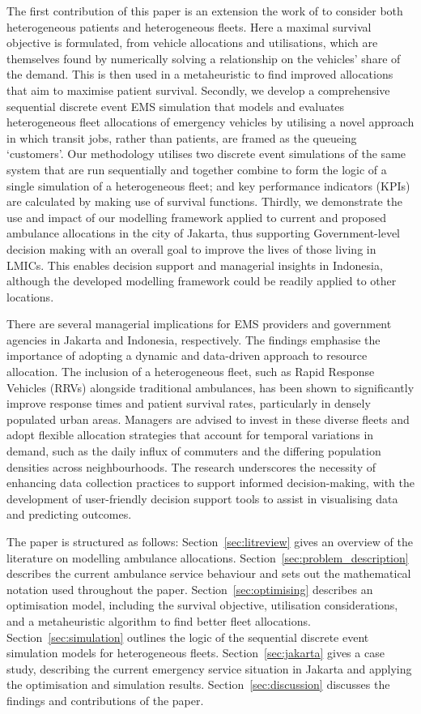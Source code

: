 \documentclass[numbers,webpdf,imaman]{ima-authoring-template}%
\begin{document}
The first contribution of this paper is an extension the work of
\citet{Knight2012918} to consider both heterogeneous patients and heterogeneous
fleets. Here a maximal survival objective is formulated, from vehicle
allocations and utilisations, which are themselves found by numerically
solving a relationship on the vehicles' share of the demand. This is then used
in a metaheuristic to find improved allocations that aim to maximise patient
survival.
Secondly, we develop a comprehensive sequential discrete event EMS
simulation that models and evaluates heterogeneous fleet allocations of
emergency vehicles by utilising a novel approach in which transit jobs, rather
than patients, are framed as the queueing `customers'. Our methodology
utilises two discrete event simulations of the same system that are run
sequentially and together combine to form the logic of a single simulation of
a heterogeneous fleet; and key performance indicators (KPIs) are calculated by
making use of survival functions.
Thirdly, we demonstrate the use and impact of our modelling framework applied
to current and proposed ambulance allocations in the city of Jakarta, thus
supporting Government-level decision making with an overall goal to improve
the lives of those living in LMICs. This enables decision support and
managerial insights in Indonesia, although the developed modelling framework
could be readily applied to other locations.

There are several managerial implications for EMS providers and
government agencies in Jakarta and Indonesia, respectively. The findings
emphasise the importance of adopting a dynamic and data-driven approach to
resource allocation. The inclusion of a heterogeneous fleet, such as Rapid
Response Vehicles (RRVs) alongside traditional ambulances, has been shown to
significantly improve response times and patient survival rates, particularly in
densely populated urban areas. Managers are advised to invest in these diverse
fleets and adopt flexible allocation strategies that account for temporal
variations in demand, such as the daily influx of commuters and the differing
population densities across neighbourhoods. The research underscores the
necessity of enhancing data collection practices to support informed
decision-making, with the development of user-friendly decision support tools to
assist in visualising data and predicting outcomes.

The paper is structured as follows:
Section~\ref{sec:litreview} gives an overview of the literature on modelling
ambulance allocations.
Section~\ref{sec:problem_description} describes the current ambulance service
behaviour and sets out the mathematical notation used throughout the paper.
Section~\ref{sec:optimising} describes an
optimisation model, including the survival objective, utilisation
considerations, and a metaheuristic algorithm to find better fleet allocations.
Section~\ref{sec:simulation} outlines the logic of the sequential discrete
event simulation models for heterogeneous fleets.
Section~\ref{sec:jakarta} gives a case study, describing the current emergency
service situation in Jakarta and applying the optimisation and simulation
results.
Section~\ref{sec:discussion} discusses the findings and contributions of the
paper.
\end{document}
